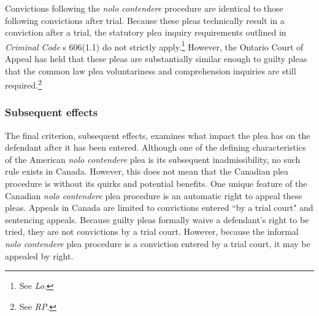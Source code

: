 Convictions following the \textit{nolo contendere} procedure are identical to those following convictions after trial. Because these pleas technically result in a conviction after a trial, the statutory plea inquiry requirements outlined in \textit{Criminal Code} s 606(1.1) do not strictly apply.\footnote{See \textit{Lo}.} However, the Ontario Court of Appeal has held that these pleas are substantially similar enough to guilty pleas that the common law plea voluntariness and comprehension inquiries are still required.\footnote{See \textit{RP}.}

\subsubsection{Subsequent effects}

The final criterion, subsequent effects, examines what impact the plea has on the defendant after it has been entered. Although one of the defining characteristics of the American \textit{nolo contendere} plea is its subsequent inadmissibility, no such rule exists in Canada. However, this does not mean that the Canadian plea procedure is without its quirks and potential benefits. One  unique feature of the Canadian \textit{nolo contendere} plea procedure is an automatic right to appeal these pleas. Appeals in Canada are limited to convictions entered ``by a trial court" and sentencing appeals. Because guilty pleas formally waive a defendant's right to be tried, they are not convictions by a trial court. However, because the informal \textit{nolo contendere} plea procedure is a conviction entered by a trial court, it may be appealed by right.